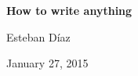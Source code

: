 \documentclass[11pt]{article}
\begin{document}
\begin{center}
   {\Large\textbf{How to write anything}}
\medskip

   {\large   Esteban D\'{i}az

\medskip
           January 27, 2015
   }
\end{center}
\nocite{*}



\end{document}
